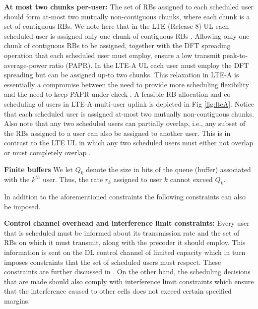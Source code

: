 \documentclass[11pt] {article}
\begin{document}
  \textbf{At most two chunks per-user:} The set of RBs assigned to each scheduled user should form at-most two mutually non-contiguous chunks, where each chunk is a set of contiguous RBs.  We note here that in the LTE (Release 8) UL each scheduled user is assigned only one  chunk of contiguous RBs \cite{3gpp:rel8}.  Allowing only one chunk of contiguous  RBs to be assigned, together with the DFT spreading operation that each scheduled user must   employ, ensure a low transmit peak-to-average-power ratio (PAPR). In the LTE-A UL each user must employ the DFT spreading but can be assigned up-to two chunks. This relaxation in LTE-A is essentially a compromise between the need to provide more scheduling flexibility and the need to keep PAPR under check \cite{3gpp}.
  A feasible RB allocation and co-scheduling of users in  LTE-A multi-user uplink  is depicted in Fig \ref{fig:lteA}. Notice that each scheduled user is assigned at-most two mutually non-contiguous chunks. Also note that any two scheduled users can partially overlap, i.e., any subset  of the RBs assigned to a user can also be assigned to another user. This is in contrast to the LTE  UL in which any two scheduled users must either not overlap or must completely overlap \cite{3gpp:rel8}.

 \textbf{Finite buffers} We let $Q_k$  denote the size in bits  of the queue (buffer)  associated with the $k^{th}$ user. Thus, the rate $r_k$ assigned to user $k$ cannot exceed $Q_k$.

In addition to the aforementioned constraints the following constraints can also be imposed.

 \textbf{Control channel overhead and interference limit constraints:} Every user that is  scheduled  must be informed about its transmission rate and the set of RBs on which it must transmit, along with the precoder it should employ. This information is sent on the DL control channel of limited capacity which in turn imposes constraints that the set of  scheduled users must respect. These constraints are further discussed in \cite{prasad:wiopt12}. On the other hand, the scheduling decisions that are made should also comply with interference limit constraints which ensure that the  interference caused to other cells does not exceed certain specified margins. 
\end{document}
